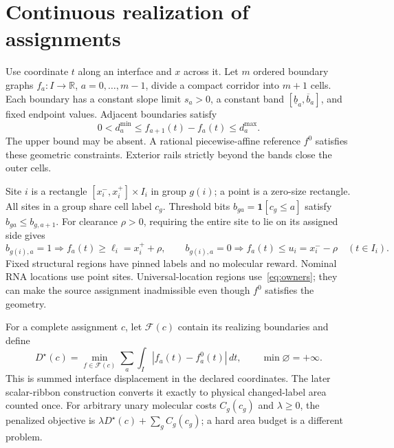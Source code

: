 \documentclass[10pt,letterpaper]{article}
\newcommand{\ind}{\mathbf 1}
\newcommand{\R}{\mathbb R}
\newcommand{\F}{\mathcal F}
\begin{document}
\section{Continuous realization of assignments}\label{sec:continuous}
Use coordinate $t$ along an interface and $x$ across it. Let $m$ ordered boundary graphs $f_a:I\to\R$, $a=0,\ldots,m-1$, divide a compact corridor into $m+1$ cells. Each boundary has a constant slope limit $s_a>0$, a constant band $[\underline b_a,\overline b_a]$, and fixed endpoint values. Adjacent boundaries satisfy
\begin{equation}
0<d_a^{\min}\le f_{a+1}(t)-f_a(t)\le d_a^{\max}.\label{eq:gaps}
\end{equation}
The upper bound may be absent. A rational piecewise-affine reference $f^0$ satisfies these geometric constraints. Exterior rails strictly beyond the bands close the outer cells.

Site $i$ is a rectangle $[x_i^-,x_i^+]\times I_i$ in group $g(i)$; a point is a zero-size rectangle. All sites in a group share cell label $c_g$. Threshold bits $b_{ga}=\ind[c_g\le a]$ satisfy $b_{ga}\le b_{g,a+1}$. For clearance $\rho>0$, requiring the entire site to lie on its assigned side gives
\begin{equation}
 b_{g(i),a}=1\Rightarrow f_a(t)\ge \ell_i=x_i^++\rho,\qquad
 b_{g(i),a}=0\Rightarrow f_a(t)\le u_i=x_i^--\rho\quad(t\in I_i).\label{eq:owners}
\end{equation}
Fixed structural regions have pinned labels and no molecular reward. Nominal RNA locations use point sites. Universal-location regions use~\eqref{eq:owners}; they can make the source assignment inadmissible even though $f^0$ satisfies the geometry.

For a complete assignment $c$, let $\F(c)$ contain its realizing boundaries and define
\begin{equation}
D^\star(c)=\min_{f\in\F(c)}\sum_a\int_I |f_a(t)-f_a^0(t)|\,dt,
\qquad \min\varnothing=+\infty.\label{eq:dstar}
\end{equation}
This is summed interface displacement in the declared coordinates. The later scalar-ribbon construction converts it exactly to physical changed-label area counted once. For arbitrary unary molecular costs $C_g(c_g)$ and $\lambda\ge0$, the penalized objective is $\lambda D^\star(c)+\sum_g C_g(c_g)$; a hard area budget is a different problem.
\end{document}

